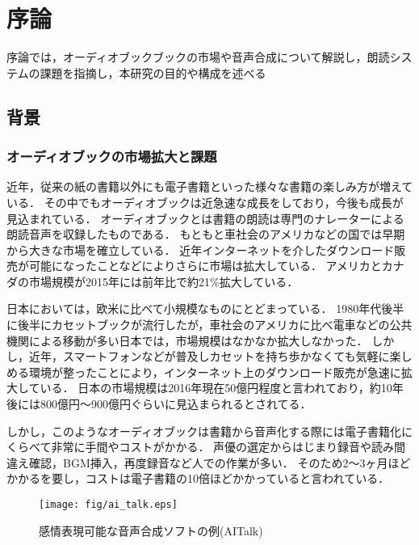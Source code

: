 \chapter{序論}
序論では，オーディオブックブックの市場や音声合成について解説し，朗読システムの課題を指摘し，本研究の目的や構成を述べる

\section{背景}
\subsection{オーディオブックの市場拡大と課題}
近年，従来の紙の書籍以外にも電子書籍といった様々な書籍の楽しみ方が増えている．
その中でもオーディオブックは近急速な成長をしており，今後も成長が見込まれている．
オーディオブックとは書籍の朗読は専門のナレーターによる朗読音声を収録したものである．
もともと車社会のアメリカなどの国では早期から大きな市場を確立している．
近年インターネットを介したダウンロード販売が可能になったことなどによりさらに市場は拡大している．
アメリカとカナダの市場規模が2015年には前年比で約21\%拡大している\cite{wsj}．

日本においては，欧米に比べて小規模なものにとどまっている．
1980年代後半に後半にカセットブックが流行したが，車社会のアメリカに比べ電車などの公共機関による移動が多い日本では，市場規模はなかなか拡大しなかった．
しかし，近年，スマートフォンなどが普及しカセットを持ち歩かなくても気軽に楽しめる環境が整ったことにより，インターネット上のダウンロード販売が急速に拡大している．
日本の市場規模は2016年現在50億円程度と言われており，約10年後には800億円〜900億円ぐらいに見込まられるとされてる．\cite{cnet}

しかし，このようなオーディオブックは書籍から音声化する際には電子書籍化にくらべて非常に手間やコストがかかる．
声優の選定からはじまり録音や読み間違え確認，BGM挿入，再度録音など人での作業が多い．
そのため2〜3ヶ月ほどかかるを要し，コストは電子書籍の10倍ほどかかっていると言われている．\cite{ueda}

\begin{figure}[ht]
  \begin{center}
    \texttt{[image: fig/ai\_talk.eps]}
    \caption{感情表現可能な音声合成ソフトの例(AITalk)}
    \label{fig:ai_talk}
  \end{center}
\end{figure}

